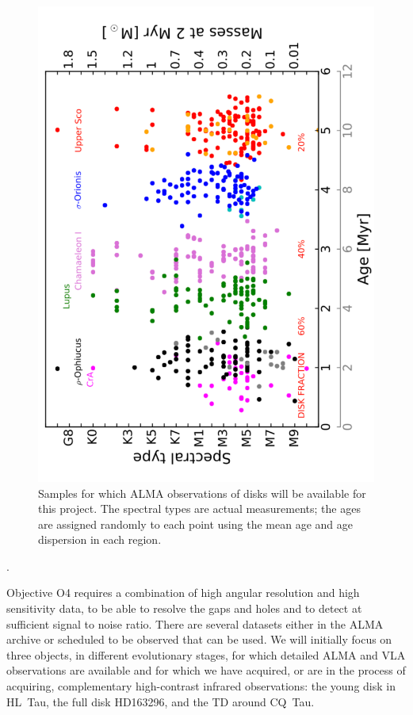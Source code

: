 \documentclass[10pt,fleqn,twoside]{article}
\begin{document}
\begin{figure}
\centerline{\includegraphics[scale=0.4,angle=-90]{f_samples_alma.pdf}}
\caption{Samples for which ALMA observations of disks will be available for this project. The spectral types are actual measurements; the ages are assigned randomly to each point using the mean age and age dispersion in each region.}
\label{f_almasamp}
\end{figure}

\vspace{1em}{\Tcol\bf ALMA Data for objective O4, O5 and O6}.

Objective O4 requires a combination of high angular resolution and high sensitivity data, to be able to resolve the gaps and holes and to detect at sufficient signal to noise ratio. There are several datasets either in the ALMA archive or scheduled to be observed that can be used. We will initially focus on three objects, in different evolutionary stages, for which detailed ALMA and VLA observations are available and for which we have acquired, or are in the process of acquiring, complementary high-contrast infrared observations: the young disk in HL~Tau, the full disk HD163296, and the TD around CQ~Tau.
\end{document}

